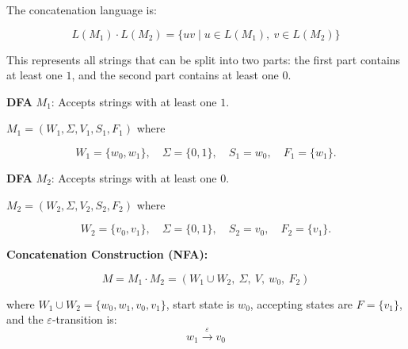 \documentclass[12pt,a4paper,openany]{article}
\begin{document}
The concatenation language is:

\[
L(M_1) \cdot L(M_2)
 = \{ uv \mid u \in L(M_1),\ v \in L(M_2) \}
\]

This represents all strings that can be split into two parts: the first part contains at least one $1$, and the second part contains at least one $0$.

\textbf{DFA} $M_1$: Accepts strings with at least one $1$.

$M_1 = (W_1,\Sigma,V_1,S_1,F_1)$ where

\[
W_1 = \{w_0,w_1\}, \quad
\Sigma = \{0,1\}, \quad
S_1 = w_0, \quad
F_1 = \{w_1\}.
\]

\begin{center}
\end{center}

\textbf{DFA} $M_2$: Accepts strings with at least one $0$.

$M_2 = (W_2,\Sigma,V_2,S_2,F_2)$ where

\[
W_2 = \{v_0,v_1\}, \quad
\Sigma = \{0,1\}, \quad
S_2 = v_0, \quad
F_2 = \{v_1\}.
\]

\begin{center}
\end{center}

\textbf{Concatenation Construction (NFA):}

\[
M = M_1 \cdot M_2 = (W_1 \cup W_2,\ \Sigma,\ V,\ w_0,\ F_2)
\]

where $W_1 \cup W_2 = \{w_0, w_1, v_0, v_1\}$, start state is $w_0$, accepting states are $F = \{v_1\}$, and the $\varepsilon$-transition is:
\[
w_1 \xrightarrow{\varepsilon} v_0
\]
\end{document}
